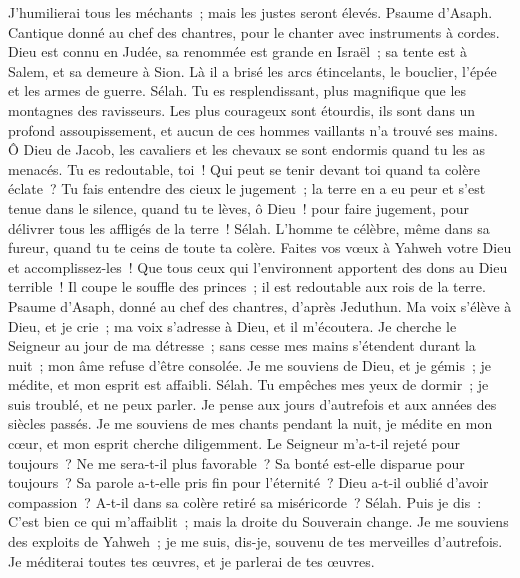\begin{multicols}{2}
J'humilierai tous les méchants~; mais les justes seront élevés.
\VerseOne{}Psaume d'Asaph. Cantique donné au chef des chantres, pour le chanter avec instruments à cordes.
Dieu est connu en Judée, sa renommée est grande en Israël~;
sa tente est à Salem, et sa demeure à Sion.
Là il a brisé les arcs étincelants, le bouclier, l'épée et les armes de guerre. Sélah.
Tu es resplendissant, plus magnifique que les montagnes des ravisseurs.
Les plus courageux sont étourdis, ils sont dans un profond assoupissement, et aucun de ces hommes vaillants n'a trouvé ses mains.
Ô Dieu de Jacob, les cavaliers et les chevaux se sont endormis quand tu les as menacés.
Tu es redoutable, toi~! Qui peut se tenir devant toi quand ta colère éclate~?
Tu fais entendre des cieux le jugement~; la terre en a eu peur et s'est tenue dans le silence,
quand tu te lèves, ô Dieu~! pour faire jugement, pour délivrer tous les affligés de la terre~! Sélah.
L'homme te célèbre, même dans sa fureur, quand tu te ceins de toute ta colère.
Faites vos vœux à Yahweh votre Dieu et accomplissez-les~! Que tous ceux qui l'environnent apportent des dons au Dieu terrible~!
Il coupe le souffle des princes~; il est redoutable aux rois de la terre.
\VerseOne{}Psaume d'Asaph, donné au chef des chantres, d'après Jeduthun.
Ma voix s'élève à Dieu, et je crie~; ma voix s'adresse à Dieu, et il m'écoutera.
Je cherche le Seigneur au jour de ma détresse~; sans cesse mes mains s'étendent durant la nuit~; mon âme refuse d'être consolée.
Je me souviens de Dieu, et je gémis~; je médite, et mon esprit est affaibli. Sélah.
Tu empêches mes yeux de dormir~; je suis troublé, et ne peux parler.
Je pense aux jours d'autrefois et aux années des siècles passés.
Je me souviens de mes chants pendant la nuit, je médite en mon cœur, et mon esprit cherche diligemment.
Le Seigneur m'a-t-il rejeté pour toujours~? Ne me sera-t-il plus favorable~?
Sa bonté est-elle disparue pour toujours~? Sa parole a-t-elle pris fin pour l'éternité~?
Dieu a-t-il oublié d'avoir compassion~? A-t-il dans sa colère retiré sa miséricorde~? Sélah.
Puis je dis~: C'est bien ce qui m'affaiblit~; mais la droite du Souverain change.
Je me souviens des exploits de Yahweh~; je me suis, dis-je, souvenu de tes merveilles d'autrefois.
Je méditerai toutes tes œuvres, et je parlerai de tes œuvres.

\end{multicols}
